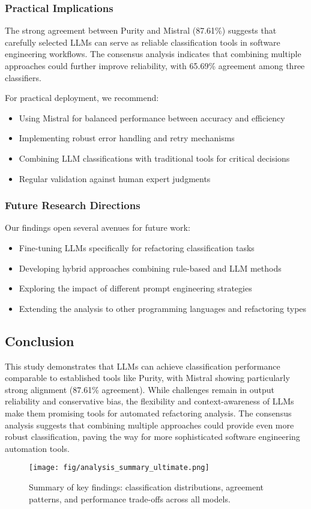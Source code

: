 \subsubsection{Practical Implications}

The strong agreement between Purity and Mistral (87.61\%) suggests that carefully selected LLMs can serve as reliable classification tools in software engineering workflows. The consensus analysis indicates that combining multiple approaches could further improve reliability, with 65.69\% agreement among three classifiers.

For practical deployment, we recommend:
\begin{itemize}
    \item Using Mistral for balanced performance between accuracy and efficiency
    \item Implementing robust error handling and retry mechanisms
    \item Combining LLM classifications with traditional tools for critical decisions
    \item Regular validation against human expert judgments
\end{itemize}

\subsubsection{Future Research Directions}

Our findings open several avenues for future work:
\begin{itemize}
    \item Fine-tuning LLMs specifically for refactoring classification tasks
    \item Developing hybrid approaches combining rule-based and LLM methods
    \item Exploring the impact of different prompt engineering strategies
    \item Extending the analysis to other programming languages and refactoring types
\end{itemize}

\subsection{Conclusion}

This study demonstrates that LLMs can achieve classification performance comparable to established tools like Purity, with Mistral showing particularly strong alignment (87.61\% agreement). While challenges remain in output reliability and conservative bias, the flexibility and context-awareness of LLMs make them promising tools for automated refactoring analysis. The consensus analysis suggests that combining multiple approaches could provide even more robust classification, paving the way for more sophisticated software engineering automation tools.

\begin{figure}[H]
\centering
\texttt{[image: fig/analysis\_summary\_ultimate.png]}
\caption{Summary of key findings: classification distributions, agreement patterns, and performance trade-offs across all models.}
\label{fig:analysis-summary}
\end{figure}